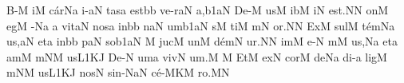 \Internote
\nosolesmescustos
\initiumgregorianum
{}%
\sgn {}B-\punctum M\egn
\sgn {}i{}\punctum M\egn
\spatium
\sgn c{\'a}r\pes Na\egn
\sgn {}i-\clivis aN\egn
\sgn tas\punctum a\egn
\spatium
\sgn {}e{st}\bmolle b\punctum b\egn
\spatium
\sgn ve{-r}\clivis aN\egn
\sgn {}a{,}\episem b1\clivis aN\egn
\spatium
\divisiominima
\spatium
\sgn D{e}-\punctum M\egn
\sgn {}us\punctum M\egn
\spatium
\sgn {}ib\punctum M\egn
\sgn {}i{}\punctum N\egn
\spatium
\sgn {}e{st.}\punctum N\augmentum N\egn
\spatium
\divisiofinalis
\spatium
{}on\punctum M\egn
{}eg\punctum M\egn
{}-\pes Na\egn
\custos a
\lineaproxima
\sgn vit\clivis aN\egn
\spatium
\sgn nos\punctum a\egn
\spatium
\sgn {}in\bmolle b\punctum b\egn
\spatium
{}n\clivis aN\egn
\sgn {}um\episem b1\clivis aN\egn
\spatium
\divisiominima
\spatium
{}s\punctum M\egn
\sgn ti{}\punctum M\egn
\spatium
{}m\punctum N\egn
\sgn {}o{r.}\punctum N\augmentum N\egn
\spatium
\divisiofinalis
\spatium
{}Ex\punctum M\egn
\sgn sul\punctum M\egn
\sgn t{\'e}m\pes Na\egn
\sgn {}u{s,}\clivis aN\egn
\spatium
\sgn {}et\punctum a\egn
\spatium
\sgn {}in\bmolle b\punctum b\egn
\spatium
{}p\clivis aN\egn
\sgn so{}\episem b1\clivis aN\egn
\spatium
\divisiominima
\spatium
\custos M
\lineaproxima
\sgn juc\punctum M\egn
\sgn {}un\punctum M\egn
\sgn d{\'e}m\punctum N\egn
\sgn {}u{r.}\punctum N\augmentum N\egn
\spatium
\divisiofinalis
\spatium
{}im\punctum M\egn
\sgn {}e-\punctum N\egn
{}m\punctum M\egn
\sgn {}u{s,}\pes Na\egn
\spatium
\sgn {}et\punctum a\egn
\spatium
\sgn {}am\punctum M\egn
{}m\clivis NM\egn
\sgn {}us\episem L1\clivis KJ\egn
\spatium
\sgn De-\punctum N\egn
\sgn {}um\punctum a\egn
\spatium
\sgn v{i}v\punctum N\egn
\sgn {}u{m.}\punctum M\egn
\spatium
\divisiofinalis
\spatium
\custos M
\lineaproxima
{}Et\punctum M\egn
\spatium
\sgn {}ex\punctum N\egn
\spatium
\sgn c{o}r\punctum M\egn
\sgn de{}\pes Na\egn
\spatium
\sgn di-\punctum a\egn
\sgn lig\punctum M\egn
{}m\clivis NM\egn
\sgn {}us\episem L1\clivis KJ\egn
\spatium
\sgn nos\punctum N\egn
\spatium
\sgn si{n-}\torculus NaN\egn
\sgn c{\'e}-\porrectus MKM\egn
\sgn ro.\punctum M\augmentum N\egn
\spatium
\Finisgregoriana

